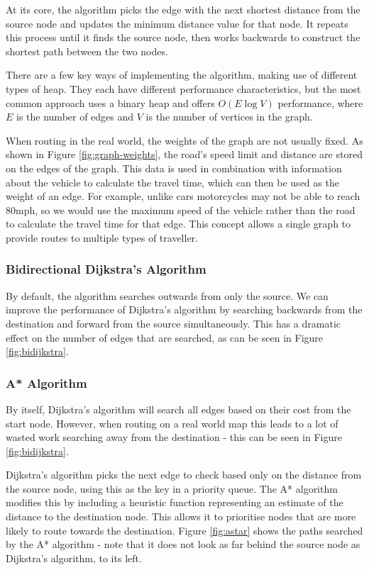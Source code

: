 \documentclass[ %
                    author={Alexander Hill},
                supervisor={Dr. Benjamin Sach},
                    degree={MEng},
                     title={MARMOSET},
                  subtitle={Multi-Agent Route Management using Online Simulation for Efficient Transportation},
                      type={research},
                      year={2016} ]{dissertation}
\begin{document}
At its core, the algorithm picks the edge with the next shortest distance from
the source node and updates the minimum distance value for that node. It repeats
this process until it finds the source node, then works backwards to construct
the shortest path between the two nodes.

There are a few key ways of implementing the algorithm, making use of different
types of heap. They each have different performance characteristics, but the
most common approach uses a binary heap and offers $O(E\log V)$ performance,
where $E$ is the number of edges and $V$ is the number of vertices in the graph.

When routing in the real world, the weights of the graph are not usually fixed.
As shown in Figure \ref{fig:graph-weights}, the road's speed limit and distance
are stored on the edges of the graph. This data is used in combination with
information about the vehicle to calculate the travel time, which can then be
used as the weight of an edge. For example, unlike cars motorcycles may not be
able to reach 80mph, so we would use the maximum speed of the vehicle rather
than the road to calculate the travel time for that edge. This concept allows a
single graph to provide routes to multiple types of traveller.

\subsubsection{Bidirectional Dijkstra's Algorithm}

By default, the algorithm searches outwards from only the source. We can improve
the performance of Dijkstra's algorithm by searching backwards from the
destination and forward from the source simultaneously. This has a dramatic
effect on the number of edges that are searched, as can be seen in Figure
\ref{fig:bidijkstra}.

\subsubsection{A* Algorithm}

By itself, Dijkstra's algorithm will search all edges based on their cost from
the start node. However, when routing on a real world map this leads to a lot of
wasted work searching away from the destination - this can be seen in Figure
\ref{fig:bidijkstra}.

Dijkstra's algorithm picks the next edge to check based only on the distance
from the source node, using this as the key in a priority queue. The A*
algorithm modifies this by including a heuristic function representing an
estimate of the distance to the destination node. This allows it to prioritise
nodes that are more likely to route towards the destination. Figure
\ref{fig:astar} shows the paths searched by the A* algorithm - note that it does
not look as far behind the source node as Dijkstra's algorithm, to its left.
\end{document}
